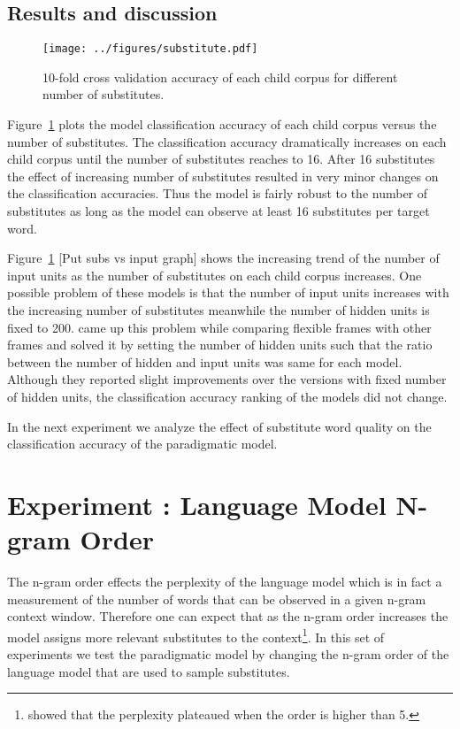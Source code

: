 \subsection{Results and discussion}
\begin{figure}[ht]
  \centering
  \texttt{[image: ../figures/substitute.pdf]}
  \caption{10-fold cross validation accuracy of each child corpus for different
  number of substitutes.}
  \label{fig:substitutes}
\end{figure} 

Figure~\ref{fig:substitutes} plots the model classification accuracy of each
child corpus versus the number of substitutes.  The classification accuracy
dramatically increases on each child corpus until the number of substitutes
reaches to 16.   After 16 substitutes the effect of increasing number of
substitutes resulted in very minor changes on the classification accuracies.
Thus the model is fairly robust to the number of substitutes as long as the
model can observe at least 16 substitutes per target word.  

Figure~\ref{fig:substitutes} [Put subs vs input graph] shows the increasing
trend of the number of input units as the number of substitutes on each child
corpus increases.  One possible problem of these models is that the number of
input units increases with the increasing number of substitutes meanwhile the
number of hidden units is fixed to 200.   \cite{clair2010} came up this problem
while comparing flexible frames with other frames and solved it by setting the
number of hidden units such that the ratio between the number of hidden and
input units was same for each model.  Although they reported slight
improvements over the versions with fixed number of hidden units, the
classification accuracy ranking of the models did not change. 

In the next experiment we analyze the effect of substitute word quality on the
classification accuracy of the paradigmatic model.

\section{Experiment : Language Model N-gram Order}
\label{s:exp_ngram}
The n-gram order effects the perplexity of the language model which is in fact
a measurement of the number of words that can be observed in a given n-gram
context window.  Therefore one can expect that as the n-gram order increases
the model assigns more relevant substitutes to the
context\footnote{\cite{Goodman2001403} showed that the perplexity plateaued when
the order is higher than 5.}.  In this set of experiments we test the
paradigmatic model by changing the n-gram order of the language model that are
used to sample substitutes.

